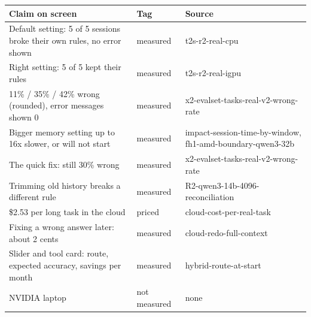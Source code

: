 \begin{longtable}{p{}p{}p{}}\toprule
\textbf{Claim on screen} & \textbf{Tag} & \textbf{Source} \\ \midrule
Default setting: 5 of 5 sessions broke their own rules, no error shown & measured & t2s-r2-real-cpu \\
Right setting: 5 of 5 kept their rules & measured & t2s-r2-real-igpu \\
11\% / 35\% / 42\% wrong (rounded), error messages shown 0 & measured & x2-evalset-tasks-real-v2-wrong-rate \\
Bigger memory setting up to 16x slower, or will not start & measured & impact-session-time-by-window, fh1-amd-boundary-qwen3-32b \\
The quick fix: still 30\% wrong & measured & x2-evalset-tasks-real-v2-wrong-rate \\
Trimming old history breaks a different rule & measured & R2-qwen3-14b-4096-reconciliation \\
\$2.53 per long task in the cloud & priced & cloud-cost-per-real-task \\
Fixing a wrong answer later: about 2 cents & measured & cloud-redo-full-context \\
Slider and tool card: route, expected accuracy, savings per month & measured & hybrid-route-at-start \\
NVIDIA laptop & not measured & none \\
\bottomrule\end{longtable}
